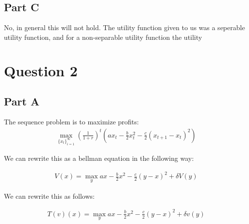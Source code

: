 \documentclass[11pt]{article} %
\begin{document}

\subsection{Part C}

No, in general this will not hold. The utility function given to us was a seperable utility function, and for a non-separable utility function the utility 

\section{Question 2}
\subsection{Part A}
The sequence problem is to maximize profits:
\begin{align*}
\max_{\{ x_t\}_{i=1}^{\infty}} \left( \frac{1}{1+r} \right)^{t}\left( ax_t - \frac{b}{2}x_t^2 - \frac{c}{2}(x_{t+1}-x_t)^2\right)
\end{align*}

We can rewrite this as a bellman equation in the following way:

\begin{align}
V(x) =\max_{y} ax - \frac{b}{2}x^2 - \frac{c}{2}(y-x)^2 + \delta V(y) \label{eqn:bell}
\end{align}

We can rewrite this as follows:

\begin{align}
T(v)(x) =\max_{y} ax - \frac{b}{2}x^2 - \frac{c}{2}(y-x)^2 + \delta v(y) \label{eqn:bellT}
\end{align}
\end{document}
